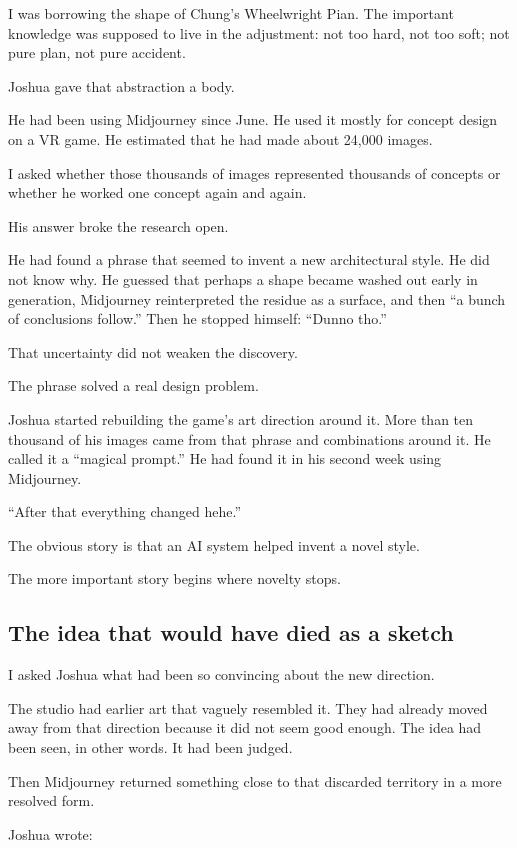 \documentclass[
]{article}
\begin{document}
I was borrowing the shape of Chung's Wheelwright Pian. The important
knowledge was supposed to live in the adjustment: not too hard, not too
soft; not pure plan, not pure accident.

Joshua gave that abstraction a body.

He had been using Midjourney since June. He used it mostly for concept
design on a VR game. He estimated that he had made about 24,000 images.

I asked whether those thousands of images represented thousands of
concepts or whether he worked one concept again and again.

His answer broke the research open.

He had found a phrase that seemed to invent a new architectural style.
He did not know why. He guessed that perhaps a shape became washed out
early in generation, Midjourney reinterpreted the residue as a surface,
and then ``a bunch of conclusions follow.'' Then he stopped himself:
``Dunno tho.''

That uncertainty did not weaken the discovery.

The phrase solved a real design problem.

Joshua started rebuilding the game's art direction around it. More than
ten thousand of his images came from that phrase and combinations around
it. He called it a ``magical prompt.'' He had found it in his second
week using Midjourney.

``After that everything changed hehe.''

The obvious story is that an AI system helped invent a novel style.

The more important story begins where novelty stops.

\subsection{The idea that would have died as a
sketch}\label{the-idea-that-would-have-died-as-a-sketch}

I asked Joshua what had been so convincing about the new direction.

The studio had earlier art that vaguely resembled it. They had already
moved away from that direction because it did not seem good enough. The
idea had been seen, in other words. It had been judged.

Then Midjourney returned something close to that discarded territory in
a more resolved form.

Joshua wrote:
\end{document}
